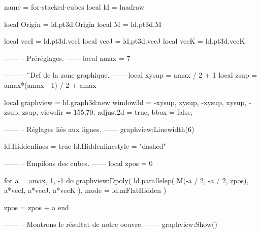 \documentclass[border = 3pt]{standalone}
\begin{document}
\begin{luadraw*}{name = for-stacked-cubes}
local ld = luadraw

local Origin = ld.pt3d.Origin
local M      = ld.pt3d.M

local vecI = ld.pt3d.vecI
local vecJ = ld.pt3d.vecJ
local vecK = ld.pt3d.vecK

------
-- Préréglages.
------
local amax = 7

------
-- ¨Def de la zone graphique.
------
local xysup = amax / 2 + 1
local zsup  = amax*(amax - 1) / 2 + amax

local graphview = ld.graph3d:new{
  window3d = {-xysup, xysup, -xysup, xysup, -zsup, zsup},
  viewdir  = {155,70},
  adjust2d = true,
  bbox     = false,
}

------
-- Réglages liés aux lignes.
------
graphview:Linewidth(6)

ld.Hiddenlines     = true
ld.Hiddenlinestyle = "dashed"

------
-- Empilons des cubes.
------
local zpos  = 0

for a = amax, 1, -1 do
  graphview:Dpoly(
    ld.parallelep(
      M(-a / 2, -a / 2, zpos),
      a*vecI, a*vecJ, a*vecK
    ),
    {mode = ld.mFlatHidden}
  )

  zpos = zpos + a
end

------
-- Montrons le résultat de notre oeuvre.
------
graphview:Show()
\end{luadraw*}
\end{document}
